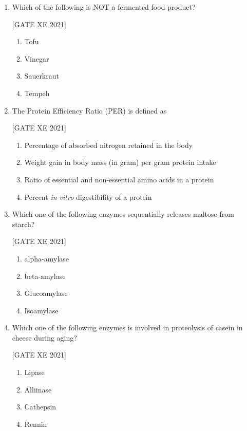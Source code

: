 \documentclass[journal,12pt,onecolumn]{IEEEtran}
\theoremstyle{remark}
\begin{document}
\begin{enumerate}[resume]
\item Which of the following is NOT a fermented food product?

\hfill[GATE XE 2021]

\begin{multicols}{2}
\begin{enumerate}
\item Tofu
\item Vinegar
\item Sauerkraut
\item Tempeh
\end{enumerate}
\end{multicols}


\item The Protein Efficiency Ratio (PER) is defined as

\hfill[GATE XE 2021]

\begin{multicols}{2}
\begin{enumerate}
\item Percentage of absorbed nitrogen retained in the body
\item Weight gain in body mass (in gram) per gram protein intake
\item Ratio of essential and non-essential amino acids in a protein
\item Percent \textit{in vitro} digestibility of a protein
\end{enumerate}
\end{multicols}


\item Which one of the following enzymes sequentially releases maltose from starch?

\hfill[GATE XE 2021]

\begin{multicols}{2}
\begin{enumerate}
\item \text alpha-amylase
\item \text beta-amylase
\item Glucoamylase
\item Isoamylase
\end{enumerate}
\end{multicols}


\item Which one of the following enzymes is involved in proteolysis of casein in cheese during aging?

\hfill[GATE XE 2021]

\begin{multicols}{2}
\begin{enumerate}
\item Lipase
\item Alliinase
\item Cathepsin
\item Rennin
\end{enumerate}
\end{multicols}



\end{enumerate}
\end{document}
